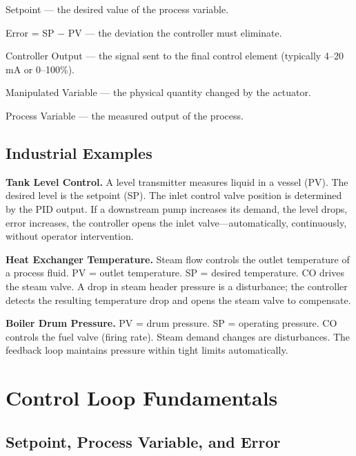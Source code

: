 \documentclass[12pt,twoside,openright]{memoir}
\begin{document}
\begin{description}[leftmargin=2em, labelwidth=2em]
  \item[SP] Setpoint --- the desired value of the process variable.
  \item[$e$] Error = SP $-$ PV --- the deviation the controller must eliminate.
  \item[CO] Controller Output --- the signal sent to the final control element (typically 4--20\,mA or 0--100\%).
  \item[MV] Manipulated Variable --- the physical quantity changed by the actuator.
  \item[PV] Process Variable --- the measured output of the process.
\end{description}

\section{Industrial Examples}

\textbf{Tank Level Control.} A level transmitter measures liquid in a vessel (PV). The desired level is the setpoint (SP). The inlet control valve position is determined by the PID output. If a downstream pump increases its demand, the level drops, error increases, the controller opens the inlet valve---automatically, continuously, without operator intervention.

\textbf{Heat Exchanger Temperature.} Steam flow controls the outlet temperature of a process fluid. PV = outlet temperature. SP = desired temperature. CO drives the steam valve. A drop in steam header pressure is a disturbance; the controller detects the resulting temperature drop and opens the steam valve to compensate.

\textbf{Boiler Drum Pressure.} PV = drum pressure. SP = operating pressure. CO controls the fuel valve (firing rate). Steam demand changes are disturbances. The feedback loop maintains pressure within tight limits automatically.

\chapter{Control Loop Fundamentals}

\section{Setpoint, Process Variable, and Error}
\end{document}
